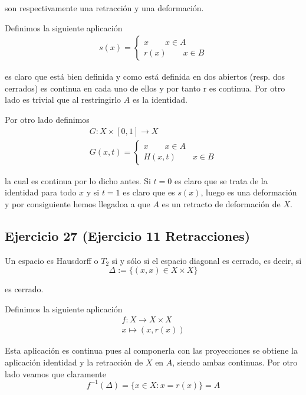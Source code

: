 \documentclass{article}
\begin{document}
son respectivamente una retracción y una deformación.

Definimos la siguiente aplicación
\begin{gather*}
s(x)=\left\lbrace \begin{array}{c}
x\qquad x\in A\\
r(x)\qquad x\in B
\end{array}\right.
\end{gather*}

es claro que está bien definida y como está definida en dos abiertos (resp. dos cerrados) es continua en cada uno de ellos y por tanto r es continua. Por otro lado es trivial que al restringirlo $A$ es la identidad.

Por otro lado definimos 
\begin{gather*}
G:X\times [0,1]\rightarrow X\\
G(x,t)=\left\lbrace\begin{array}{c}
x\qquad x\in A\\
H(x,t) \qquad x\in B
\end{array}\right.
\end{gather*}

la cual es continua por lo dicho antes. Si $t=0$ es claro que se trata de la identidad para todo $x$ y si $t=1$ es claro que es $s(x)$, luego es una deformación y por consiguiente hemos llegadoa a que $A$ es un retracto de deformación de $X$.

\subsection{Ejercicio 27 (Ejercicio 11 Retracciones)}
Un espacio es Hausdorff o $T_2$ si y sólo si el espacio diagonal es cerrado, es decir, si
\begin{equation*}
\Delta:=\{(x,x)\in X\times X\} 
\end{equation*}

es cerrado.

Definimos la siguiente aplicación 
\begin{gather*}
f:X\rightarrow X\times X\\
x\mapsto (x,r(x))
\end{gather*}

Esta aplicación es continua pues al componerla con las proyecciones se obtiene la aplicación identidad y la retracción de $X$ en $A$, siendo ambas continuas. Por otro lado veamos que claramente
\begin{equation*}
f^{-1}(\Delta)=\{x\in X: x=r(x)\}=A
\end{equation*}
\end{document}
